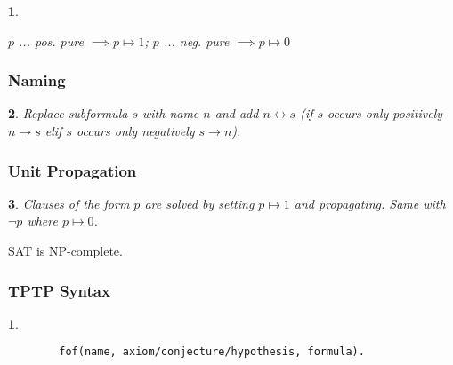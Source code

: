 \documentclass[9pt]{extarticle}
\theoremstyle{theoremstyle}
\newtheorem*{green}{}
\newtheorem*{blue}{}
\begin{document}
\begin{multicols}{3}
\begin{minipage}[t]{.30\textwidth}
\begin{blue}
\begin{center}
\end{center}

$p$ ... pos. pure $\implies p \mapsto 1$; $p$ ... neg. pure $\implies p \mapsto 0$

\end{blue}

\subsubsection*{Naming}
\begin{blue}
Replace subformula $s$ with name $n$ and add $n\leftrightarrow s$ (if $s$ occurs only positively $n\rightarrow s$ elif $s$ occurs only negatively $s \rightarrow n$).
\end{blue}

\subsubsection*{Unit Propagation}
\begin{blue}
Clauses of the form $p$ are solved by setting $p \mapsto 1$ and propagating. Same with $\lnot p$ where $p \mapsto 0$.
\end{blue}

SAT is NP-complete.


\subsubsection*{TPTP Syntax}
\begin{green}
	
	\begin{verbatim}
		fof(name, axiom/conjecture/hypothesis, formula).
	\end{verbatim}
	

\end{green}
\end{minipage}
\end{multicols}
\end{document}
